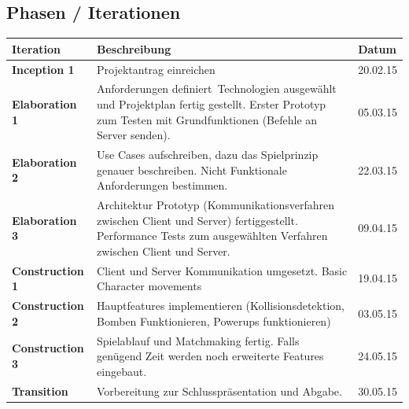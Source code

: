 \documentclass[11pt]{scrartcl}
\begin{document}
\subsection{Phasen / Iterationen}
\label{sec:Phasen / Iterationen}

\begin{table}[h]
\begin{tabularx}{\textwidth}{l X l}
\textbf{Iteration} & \textbf{Beschreibung} & \textbf{Datum} \\
\hline
\textbf{Inception 1} & Projektantrag einreichen & 20.02.15 \\
\hline
\textbf{Elaboration 1} & Anforderungen definiert\, Technologien ausgewählt 
und Projektplan fertig gestellt. Erster Prototyp zum Testen mit Grundfunktionen (Befehle an Server senden). & 05.03.15 \\
\hline
\textbf{Elaboration 2} & Use Cases aufschreiben, dazu das Spielprinzip genauer beschreiben. 
Nicht Funktionale Anforderungen bestimmen. & 22.03.15 \\
\hline
\textbf{Elaboration 3} & Architektur Prototyp (Kommunikationsverfahren 
zwischen Client und Server) fertiggestellt. 
Performance Tests zum ausgewählten Verfahren zwischen Client und Server. & 09.04.15 \\
\hline
\textbf{Construction 1} & Client und Server Kommunikation umgesetzt.
Basic Character movements & 19.04.15 \\
\hline
\textbf{Construction 2} & Hauptfeatures implementieren
 (Kollisionsdetektion, Bomben Funktionieren, Powerups funktionieren) & 03.05.15 \\
\hline
\textbf{Construction 3} & Spielablauf und Matchmaking fertig. Falls genügend Zeit werden
 noch erweiterte Features eingebaut. & 24.05.15 \\
\hline
\textbf{Transition} & Vorbereitung zur Schlusspräsentation 
und Abgabe. & 30.05.15 \\
\hline
\end{tabularx}
\end{table}
\end{document}
